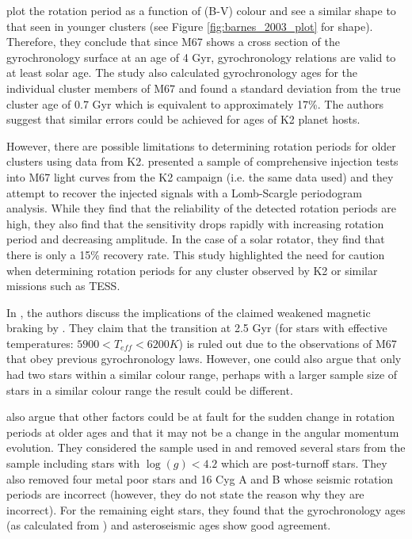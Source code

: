 \citet{Barnes_etal_2016} plot the rotation period as a function of (B-V) colour and see a similar shape to that seen in younger clusters (see Figure \ref{fig:barnes_2003_plot} for shape). Therefore, they conclude that since M67 shows a cross section of the gyrochronology surface at an age of 4 Gyr, gyrochronology relations are valid to at least solar age. The study also calculated gyrochronology ages for the individual cluster members of M67 and found a standard deviation from the true cluster age of 0.7 Gyr which is equivalent to approximately 17\%. The authors suggest that similar errors could be achieved for ages of K2 planet hosts.

However, there are possible limitations to determining rotation periods for older clusters using data from K2. \citet{Esselstein_etal_2018} presented a sample of comprehensive injection tests into M67 light curves from the K2 campaign (i.e. the same data \citealt{Barnes_etal_2016} used) and they attempt to recover the injected signals with a Lomb-Scargle periodogram analysis. While they find that the reliability of the detected rotation periods are high, they also find that the sensitivity drops rapidly with increasing rotation period and decreasing amplitude. In the case of a solar rotator, they find that there is only a 15\% recovery rate. This study highlighted the need for caution when determining rotation periods for any cluster observed by K2 or similar missions such as TESS.

In \citet{Barnes_etal_2016_aspect_gyro}, the authors discuss the implications of the claimed weakened magnetic braking by \citet{van_Saders_etal_2016}. They claim that the transition at 2.5 Gyr (for stars with effective temperatures: $5900 < T_{eff} < 6200 K$) is ruled out due to the observations of M67 \citep{Barnes_etal_2016} that obey previous gyrochronology laws. However, one could also argue that \citet{Barnes_etal_2016} only had two stars within a similar colour range, perhaps with a larger sample size of stars in a similar colour range the result could be different.

\citet{Barnes_etal_2016_aspect_gyro} also argue that other factors could be at fault for the sudden change in rotation periods at older ages and that it may not be a change in the angular momentum evolution. They considered the sample used in \citet{van_Saders_etal_2016} and removed several stars from the sample including stars with $\log(g) < 4.2$ which are post-turnoff stars. They also removed four metal poor stars and 16 Cyg A and B whose seismic rotation periods are incorrect (however, they do not state the reason why they are incorrect). For the remaining eight stars, they found that the gyrochronology ages (as calculated from \citealt{Barnes_2010}) and asteroseismic ages show good agreement.

